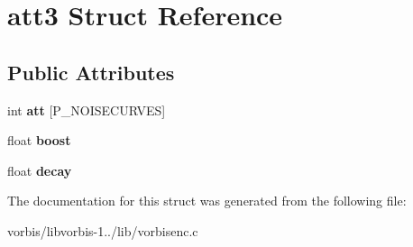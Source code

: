 \hypertarget{structatt3}{\section{att3 Struct Reference}
\label{structatt3}
}
\subsection*{Public Attributes}
\begin{DoxyCompactItemize}
\item 
\hypertarget{structatt3_a59582b74ab82141600c65f30d8459632}{int {\bfseries att} \mbox{[}P\+\_\+\+N\+O\+I\+S\+E\+C\+U\+R\+V\+E\+S\mbox{]}}\label{structatt3_a59582b74ab82141600c65f30d8459632}

\item 
\hypertarget{structatt3_a3f4c1b26c34e25a579287669743f32a4}{float {\bfseries boost}}\label{structatt3_a3f4c1b26c34e25a579287669743f32a4}

\item 
\hypertarget{structatt3_a9149df466d618da5dde12351152ecab4}{float {\bfseries decay}}\label{structatt3_a9149df466d618da5dde12351152ecab4}

\end{DoxyCompactItemize}


The documentation for this struct was generated from the following file\+:\begin{DoxyCompactItemize}
\item 
vorbis/libvorbis-\/1../lib/vorbisenc.\+c\end{DoxyCompactItemize}
